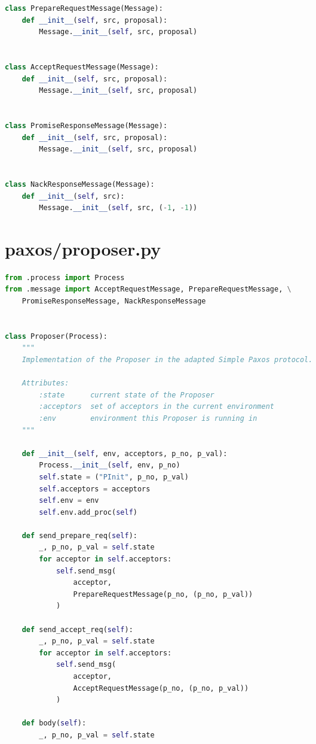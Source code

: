 \begin{landscape}
\begin{multicols*}{2}
\begin{lstlisting}[style=SourceCodeListing,language=Python]
class PrepareRequestMessage(Message):
    def __init__(self, src, proposal):
        Message.__init__(self, src, proposal)


class AcceptRequestMessage(Message):
    def __init__(self, src, proposal):
        Message.__init__(self, src, proposal)


class PromiseResponseMessage(Message):
    def __init__(self, src, proposal):
        Message.__init__(self, src, proposal)


class NackResponseMessage(Message):
    def __init__(self, src):
        Message.__init__(self, src, (-1, -1))
\end{lstlisting}
\end{multicols*}

\newpage


\section{paxos/proposer.py}
\begin{multicols*}{2}
\begin{lstlisting}[style=SourceCodeListing,language=Python]
from .process import Process
from .message import AcceptRequestMessage, PrepareRequestMessage, \
    PromiseResponseMessage, NackResponseMessage


class Proposer(Process):
    """
    Implementation of the Proposer in the adapted Simple Paxos protocol.

    Attributes:
        :state      current state of the Proposer
        :acceptors  set of acceptors in the current environment
        :env        environment this Proposer is running in
    """

    def __init__(self, env, acceptors, p_no, p_val):
        Process.__init__(self, env, p_no)
        self.state = ("PInit", p_no, p_val)
        self.acceptors = acceptors
        self.env = env
        self.env.add_proc(self)

    def send_prepare_req(self):
        _, p_no, p_val = self.state
        for acceptor in self.acceptors:
            self.send_msg(
                acceptor,
                PrepareRequestMessage(p_no, (p_no, p_val))
            )

    def send_accept_req(self):
        _, p_no, p_val = self.state
        for acceptor in self.acceptors:
            self.send_msg(
                acceptor,
                AcceptRequestMessage(p_no, (p_no, p_val))
            )

    def body(self):
        _, p_no, p_val = self.state


\end{lstlisting}
\end{multicols*}
\end{landscape}
